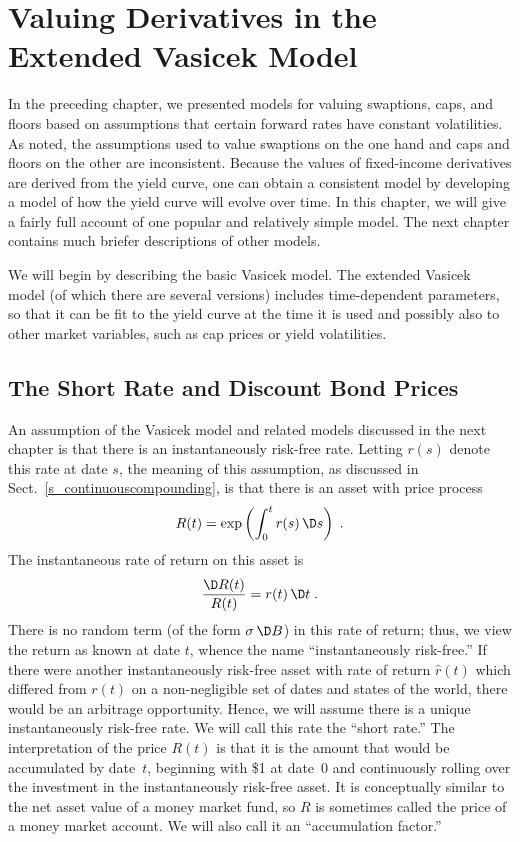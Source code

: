 \chapter{Valuing Derivatives in the Extended Vasicek Model}\label{c_vasicek}
In the preceding chapter, we presented models for valuing swaptions, caps, and floors based on assumptions that certain forward rates have constant volatilities.  As noted, the assumptions used to value swaptions on the one hand and caps and floors on the other are inconsistent.  Because the values of fixed-income derivatives are derived from the yield curve, one can obtain a consistent model by developing a model of how the yield curve will evolve over time.  In this chapter, we will give a fairly full account of one popular and relatively simple model.  The next chapter contains much briefer descriptions of other models.

We will begin by describing the basic Vasicek model.  The extended Vasicek model (of which there are several versions) includes time-dependent parameters, so that it can be fit to the yield curve at the time it is used and possibly also to other market variables, such as cap prices or yield volatilities.  


\section{The Short Rate and Discount Bond Prices}\label{s_vasicek1}

An assumption of the Vasicek model and related models discussed in the next chapter is that there is an instantaneously risk-free rate.  Letting $r(s)$ denote this rate at date $s$, the meaning of this assumption, as discussed in Sect.~\ref{s_continuouscompounding}, is that there is an asset with price process
$$R(t) = \exp\left(\int_0^t r(s)\,\D s\right)\; .$$
The instantaneous rate of return on this asset is
$$\frac{\D R(t)}{R(t)} = r(t)\,\D t\; .$$
There is no random term (of the form $\sigma\,\D B$) in this rate of return; thus, we view the return as known at date $t$, whence the name ``instantaneously risk-free.''  If there were another instantaneously risk-free asset with rate of return $\hat{r}(t)$ which differed from $r(t)$ on a non-negligible set of dates and states of the world, there would be an arbitrage opportunity.  Hence, we will assume there is a unique instantaneously risk-free rate.  We will call this rate the ``short rate.''  The interpretation of the price $R(t)$ is that it is the amount that would be accumulated by date~$t$, beginning with \$1 at date~0 and continuously rolling over the investment in the instantaneously risk-free asset.  It is conceptually similar to the net asset value of a money market fund, so $R$ is sometimes called the price of a money market account.  We will also call it an ``accumulation factor.''

